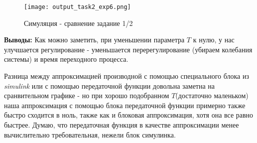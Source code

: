 \newpage
\begin{figure}[ht]
  \centering
  \texttt{[image: output\_task2\_exp6.png]}
\caption{Симуляция - сравнение задание 1/2}
\end{figure}

\textbf{Выводы:} Как можно заметить, при уменьшении параметра $T$ к нулю, у нас улучшается регулирование - уменьшается перерегулирование (убираем колебания системы) и время переходного процесса.

Разница между аппроксимацией производной с помощью специального блока из \textit{simulink} или с помощью передаточной функции довольна заметна на сранвительном графике - но при хорошо подобранном $T$(достаточно маленьком) наша аппроксимация с помощью блока передаточной функции примерно также быстро сходится 
в ноль, также как и блоковая аппроксимация, хотя она все равно быстрее. Думаю, что передаточная функция в качестве аппроксимации менее вычислительно требовательная, нежели блок симулинка.

\endinput